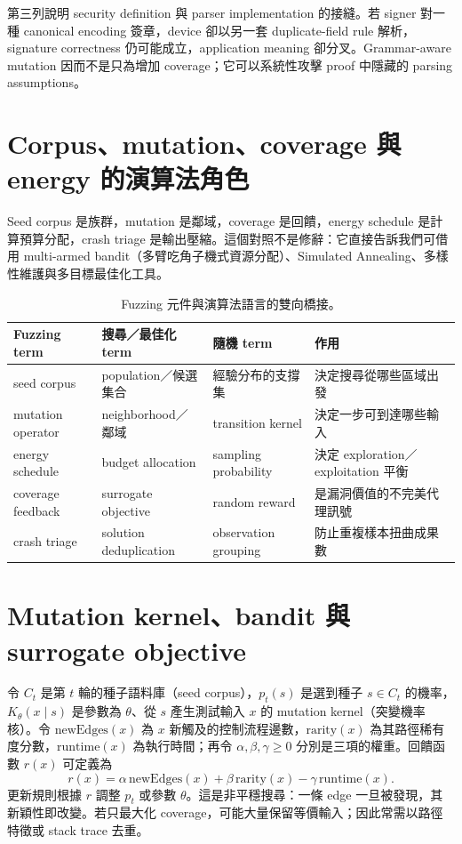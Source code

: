 \documentclass[11pt,a4paper,oneside,openany]{book}
\begin{document}
第三列說明 security definition 與 parser implementation 的接縫。若 signer 對一種 canonical encoding 簽章，device 卻以另一套 duplicate-field rule 解析，signature correctness 仍可能成立，application meaning 卻分叉。Grammar-aware mutation 因而不是只為增加 coverage；它可以系統性攻擊 proof 中隱藏的 parsing assumptions。

\section{Corpus、mutation、coverage 與 energy 的演算法角色}
\begin{coreintuition}
Seed corpus 是族群，mutation 是鄰域，coverage 是回饋，energy schedule 是計算預算分配，crash triage 是輸出壓縮。這個對照不是修辭：它直接告訴我們可借用 multi-armed bandit（多臂吃角子機式資源分配）、Simulated Annealing、多樣性維護與多目標最佳化工具。
\end{coreintuition}

\begin{table}[htbp]
\centering
\caption{Fuzzing 元件與演算法語言的雙向橋接。}
\begin{tabularx}{\textwidth}{@{}lllY@{}}
\toprule
Fuzzing term & 搜尋／最佳化 term & 隨機 term & 作用 \\
\midrule
seed corpus & population／候選集合 & 經驗分布的支撐集 & 決定搜尋從哪些區域出發 \\
mutation operator & neighborhood／鄰域 & transition kernel & 決定一步可到達哪些輸入 \\
energy schedule & budget allocation & sampling probability & 決定 exploration／exploitation 平衡 \\
coverage feedback & surrogate objective & random reward & 是漏洞價值的不完美代理訊號 \\
crash triage & solution deduplication & observation grouping & 防止重複樣本扭曲成果數 \\
\bottomrule
\end{tabularx}
\label{tab:fuzz-bridge}
\end{table}

\section{Mutation kernel、bandit 與 surrogate objective}
令 $C_t$ 是第 $t$ 輪的種子語料庫（seed corpus），$p_t(s)$ 是選到種子 $s\in C_t$ 的機率，$K_\theta(x\mid s)$ 是參數為 $\theta$、從 $s$ 產生測試輸入 $x$ 的 mutation kernel（突變機率核）。令 $\mathrm{newEdges}(x)$ 為 $x$ 新觸及的控制流程邊數，$\mathrm{rarity}(x)$ 為其路徑稀有度分數，$\mathrm{runtime}(x)$ 為執行時間；再令 $\alpha,\beta,\gamma\ge0$ 分別是三項的權重。回饋函數 $r(x)$ 可定義為
\[
 r(x)=\alpha\,\mathrm{newEdges}(x)
 +\beta\,\mathrm{rarity}(x)
 -\gamma\,\mathrm{runtime}(x).
\]
更新規則根據 $r$ 調整 $p_t$ 或參數 $\theta$。這是非平穩搜尋：一條 edge 一旦被發現，其新穎性即改變。若只最大化 coverage，可能大量保留等價輸入；因此常需以路徑特徵或 stack trace 去重。
\end{document}
